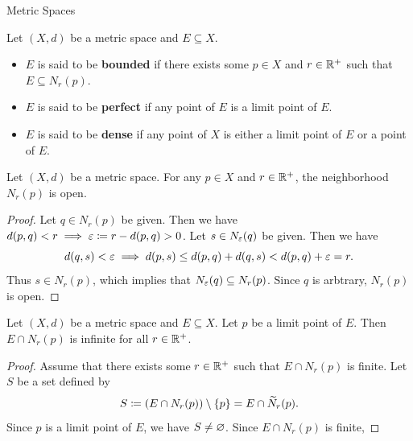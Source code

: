 \begin{section}{Metric Spaces}
\bigskip

\begin{definition} \label{def:BoundedPerfectDenseSets}
    Let $(X, d)$ be a metric space and $E \subseteq X$.
    \begin{itemize}
        \item $E$ is said to be \textbf{bounded} if there exists some $p \in X$ and
        $r \in \R^{+}$ such that $E \subseteq N_{r}(p)$.
        \item $E$ is said to be \textbf{perfect} if any point of $E$ is a limit point of $E$.
        \item $E$ is said to be \textbf{dense} if any point of $X$ is either a limit point of $E$ or a point of $E$.
    \end{itemize}
\end{definition}

\bigskip

\begin{theorem} \label{thm:NeighborhoodIsOpen}
    Let $(X, d)$ be a metric space. For any $p \in X$ and $r \in \R^{+}$, the neighborhood $N_{r}(p)$ is open.
\end{theorem}

\begin{proof}
    Let $q \in N_{r}(p)$ be given. Then we have $d(p, q) < r \implies \veps \coloneqq r - d(p, q) > 0$.
    Let $s \in N_{\veps}(q)$ be given. Then we have
    \[
    d(q, s) < \veps \implies d(p, s) \leq d(p, q) + d(q, s) < d(p, q) + \veps = r.
    \]
    Thus $s \in N_{r}(p)$, which implies that $N_{\veps}(q) \subseteq N_{r}(p)$. Since $q$ is arbtrary, $N_{r}(p)$ is open.
\end{proof}

\bigskip

\begin{theorem} \label{thm:LimitPointNeighborhoodContainsInfiniteElements}
    Let $(X, d)$ be a metric space and $E \subseteq X$. Let $p$ be a limit point of $E$.
    Then $E \cap N_{r}(p)$ is infinite for all $r \in \R^{+}$.
\end{theorem}

\begin{proof}
    Assume that there exists some $r \in \R^{+}$ such that $E \cap N_{r}(p)$ is finite. Let $S$ be a set defined by
    \[
    S \coloneqq (E \cap N_{r}(p)) \setminus \set*{p} = E \cap \widetilde{N}_{r}(p).
    \]
    Since $p$ is a limit point of $E$, we have $S \neq \vnot$. Since $E \cap N_{r}(p)$ is finite,
    

\end{proof}
\end{section}
